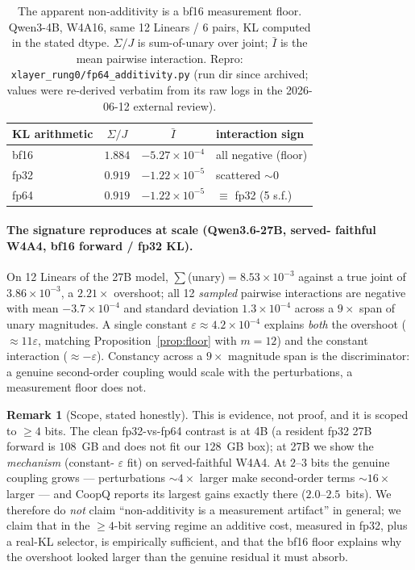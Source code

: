 \documentclass[11pt]{article}
\theoremstyle{plain}
\theoremstyle{definition}
\newtheorem{remark}[theorem]{Remark}
\begin{document}
\begin{table}[t]\centering
\small
\caption{The apparent non-additivity is a bf16 measurement floor. Qwen3-4B,
W4A16, same 12 Linears / 6 pairs, KL computed in the stated dtype. $\Sigma/J$ is
sum-of-unary over joint; $\bar I$ is the mean pairwise interaction.
Repro: \texttt{xlayer\_rung0/fp64\_additivity.py} (run dir since archived; values
were re-derived verbatim from its raw logs in the 2026-06-12 external review).}
\label{tab:precision}
\begin{tabular}{lccl}
\toprule
KL arithmetic & $\Sigma/J$ & $\bar I$ & interaction sign \\
\midrule
bf16 & $1.884$ & $-5.27\times10^{-4}$ & all negative (floor) \\
fp32 & $0.919$ & $-1.22\times10^{-5}$ & scattered $\sim 0$ \\
fp64 & $0.919$ & $-1.22\times10^{-5}$ & $\equiv$ fp32 (5 s.f.) \\
\bottomrule
\end{tabular}
\end{table}

\paragraph{The signature reproduces at scale (Qwen3.6-27B, served-%
faithful W4A4, bf16 forward / fp32 KL).} On 12 Linears of the 27B model,
$\sum$(unary)$=8.53\times10^{-3}$ against a true joint of $3.86\times10^{-3}$, a
$2.21\times$ overshoot; all 12 \emph{sampled} pairwise interactions are negative with mean
$-3.7\times10^{-4}$ and standard deviation $1.3\times10^{-4}$ across a $9\times$
span of unary magnitudes. A single constant $\varepsilon\approx4.2\times10^{-4}$
explains \emph{both} the overshoot ($\approx 11\varepsilon$, matching
Proposition~\ref{prop:floor} with $m=12$) and the constant interaction
($\approx-\varepsilon$). Constancy across a $9\times$ magnitude span is the
discriminator: a genuine second-order coupling would scale with the
perturbations, a measurement floor does not.

\begin{remark}[Scope, stated honestly]\label{rem:scope}
This is evidence, not proof, and it is scoped to $\ge 4$ bits. The clean
fp32-vs-fp64 contrast is at 4B (a resident fp32 27B forward is $108$~GB and does
not fit our $128$~GB box); at 27B we show the \emph{mechanism} (constant-%
$\varepsilon$ fit) on served-faithful W4A4. At $2$--$3$ bits the genuine coupling
grows --- perturbations $\sim\!4\times$ larger make second-order terms
$\sim\!16\times$ larger --- and CoopQ \cite{coopq} reports its largest gains
exactly there ($2.0$--$2.5$~bits). We therefore do \emph{not} claim
``non-additivity is a measurement artifact'' in general; we claim that in the
$\ge 4$-bit serving regime an additive cost, measured in fp32, plus a real-KL
selector, is empirically sufficient, and that the bf16 floor explains why the
overshoot looked larger than the genuine residual it must absorb.
\end{remark}
\end{document}

